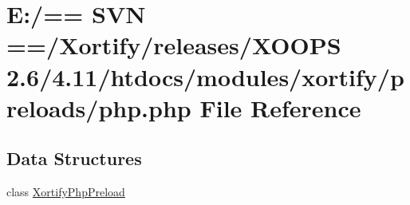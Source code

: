 \hypertarget{php_8php}{\section{E\-:/== S\-V\-N ==/\-Xortify/releases/\-X\-O\-O\-P\-S 2.6/4.11/htdocs/modules/xortify/preloads/php.php File Reference}
\label{php_8php}
}
\subsection*{Data Structures}
\begin{DoxyCompactItemize}
\item 
class \hyperlink{class_xortify_php_preload}{Xortify\-Php\-Preload}
\end{DoxyCompactItemize}
